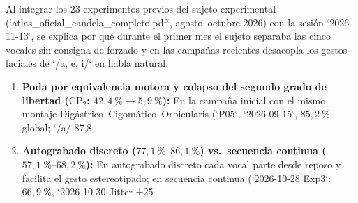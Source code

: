 \documentclass[11pt,a4paper]{article}
\begin{document}
Al integrar los 23 experimentos previos del sujeto experimental (`atlas\_oficial\_candela\_completo.pdf`, agosto--octubre 2026) con la sesi\'on `2026-11-13`, se explica por qu\'e durante el primer mes el sujeto separaba las cinco vocales sin consigna de forzado y en las campa\~nas recientes desacopla los gestos faciales de `/a, e, i/` en habla natural:
\begin{enumerate}
    \item \textbf{Poda por equivalencia motora y colapso del segundo grado de libertad ($\text{CP}_2$: $42{,}4\ \% \to 5{,}9\ \%$):} En la campa\~na inicial con el mismo montaje Dig\'astrico--Cigom\'atico--Orbicularis (`P05`, `2026-09-15`, $85{,}2\ \%$ global; `/a/ 87,8 %
    \item \textbf{Autograbado discreto ($77{,}1\ \%\text{--}86{,}1\ \%$) vs.\ secuencia continua ($57{,}1\ \%\text{--}68{,}2\ \%$):} En autograbado discreto cada vocal parte desde reposo y facilita el gesto estereotipado; en secuencia continua (`2026-10-28 Exp3`: $66{,}9\ \%$, `2026-10-30 Jitter ±25%

\end{enumerate}
\end{document}
